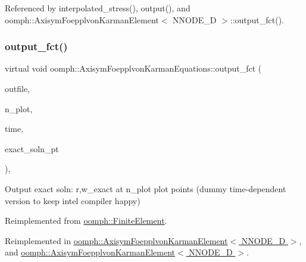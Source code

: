 Referenced by interpolated\+\_\+stress(), output(), and oomph\+::\+Axisym\+Foepplvon\+Karman\+Element$<$ N\+N\+O\+D\+E\+\_\+D $>$\+::output\+\_\+fct().

\mbox{\label{classoomph_1_1AxisymFoepplvonKarmanEquations_a14d84273c5e7a3cdec8fb9b228d675c3}} 
\subsubsection{\texorpdfstring{output\+\_\+fct()}{output\_fct()}\hspace{0.1cm}{\footnotesize\ttfamily [4/4]}}
{\footnotesize\ttfamily virtual void oomph\+::\+Axisym\+Foepplvon\+Karman\+Equations\+::output\+\_\+fct (\begin{DoxyParamCaption}\item[{std\+::ostream \&}]{outfile,  }\item[{const unsigned \&}]{n\+\_\+plot,  }\item[{const double \&}]{time,  }\item[{\hyperlink{classoomph_1_1FiniteElement_ad4ecf2b61b158a4b4d351a60d23c633e}{Finite\+Element\+::\+Unsteady\+Exact\+Solution\+Fct\+Pt}}]{exact\+\_\+soln\+\_\+pt }\end{DoxyParamCaption})\hspace{0.3cm}{\ttfamily [inline]}, {\ttfamily [virtual]}}



Output exact soln\+: r,w\+\_\+exact at n\+\_\+plot plot points (dummy time-\/dependent version to keep intel compiler happy) 



Reimplemented from \hyperlink{classoomph_1_1FiniteElement_a2a8426dccd57b927be0ae0eec00d0479}{oomph\+::\+Finite\+Element}.



Reimplemented in \hyperlink{classoomph_1_1AxisymFoepplvonKarmanElement_a290c4391d1da3688805466cf2852a93e}{oomph\+::\+Axisym\+Foepplvon\+Karman\+Element$<$ N\+N\+O\+D\+E\+\_\+D $>$}, and \hyperlink{classoomph_1_1AxisymFoepplvonKarmanElement_a290c4391d1da3688805466cf2852a93e}{oomph\+::\+Axisym\+Foepplvon\+Karman\+Element$<$ N\+N\+O\+D\+E\+\_\+D $>$}.



